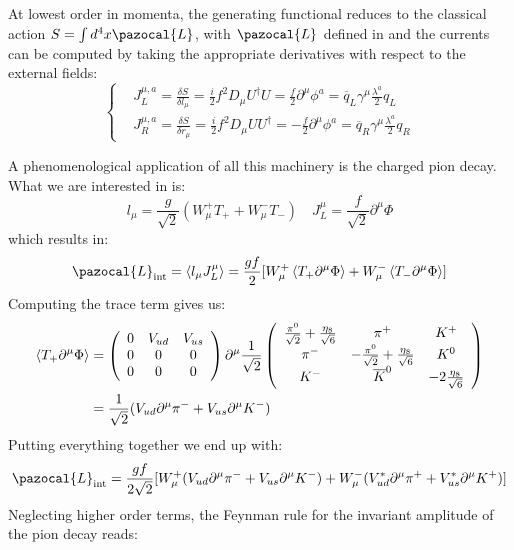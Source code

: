 \documentclass[../main.tex]{subfiles}
\begin{document}
At lowest order in momenta, the generating functional reduces to the classical action $S=\int d^4x\pazocal{L}$, with $\pazocal{L}$ defined in  and the currents can be computed by taking the appropriate derivatives with respect to the external fields:
\[
\left\{
\begin{aligned}
&J_L^{\mu,a}=\frac{\delta S}{\delta l_\mu}=\frac{i}{2}f^2D_\mu U^\dagger U=\frac{f}{2}\partial^\mu\phi^a=\overline{q}_L\gamma^\mu\frac{\lambda^a}{2}q_L\\
&J_R^{\mu,a}=\frac{\delta S}{\delta r_\mu}=\frac{i}{2}f^2D_\mu UU^\dagger=-\frac{f}{2}\partial^\mu\phi^a=\overline{q}_R\gamma^\mu\frac{\lambda^a}{2}q_R
\end{aligned}
\right.
\]
\begin{kaobox}[frametitle=Charged Pion Decay]
A phenomenological application of all this machinery is the charged pion decay. What we are interested in is:
\[
l_\mu=\frac{g}{\sqrt{2}}(W_\mu^+T_++W_\mu^-T_-) \quad J_L^\mu=\frac{f}{\sqrt{2}}\partial^\mu\Phi
\]
which results in:
\[
\pazocal{L}_{\text{int}}=\Braket{l_\mu J^\mu_L}=\frac{gf}{2}[W_\mu^+\Braket{T_+\partial^\mu\Phi}+W_\mu^-\Braket{T_-\partial^\mu\Phi}]
\]
Computing the trace term gives us:
\begin{align*}
\Braket{T_+\partial^\mu\Phi}&=\left(\begin{array}{ccc}
    0 & V_{ud} & V_{us} \\
    0 & 0 & 0 \\
    0 & 0 & 0
\end{array}\right)\partial^\mu\frac{1}{\sqrt{2}}\left(\begin{array}{ccc}
    \frac{\pi^0}{\sqrt{2}}+\frac{\eta_8}{\sqrt{6}} & \pi^+ & K^+ \\
    \pi^- & -\frac{\pi^0}{\sqrt{2}}+\frac{\eta_8}{\sqrt{6}} & K^0 \\
    K^- & \overline{K}^0 & -2\frac{\eta_8}{\sqrt{6}} \\
\end{array}\right)\\
&=\frac{1}{\sqrt{2}}(V_{ud}\partial^\mu\pi^-+V_{us}\partial^\mu K^-)
\end{align*}
Putting everything together we end up with:
\[
\pazocal{L}_{\text{int}}=\frac{gf}{2\sqrt{2}}[W_\mu^+(V_{ud}\partial^\mu\pi^-+V_{us}\partial^\mu K^-)+W_\mu^-(V_{ud}^*\partial^\mu\pi^++V_{us}^*\partial^\mu K^+)]
\]
Neglecting higher order terms, the Feynman rule for the invariant amplitude of the pion decay reads:

\end{kaobox}
\end{document}
